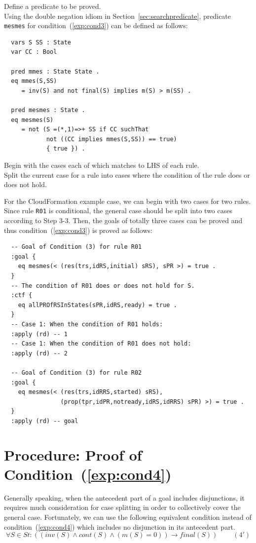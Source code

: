 \documentclass[12pt]{report}
\newcommand{\ra}{\rightarrow}
\begin{document}
 Define a predicate to be proved.\\
Using the double negation idiom in Section~\ref{sec:searchpredicate},
predicate {\tt mesmes} for condition~(\ref{exp:cond3}) can be defined
as follows:
\small
\begin{verbatim}
  vars S SS : State
  var CC : Bool

  pred mmes : State State .
  eq mmes(S,SS)
     = inv(S) and not final(S) implies m(S) > m(SS) .

  pred mesmes : State .
  eq mesmes(S)
     = not (S =(*,1)=>+ SS if CC suchThat
            not ((CC implies mmes(S,SS)) == true)
            { true }) .
\end{verbatim}
\normalsize

 Begin with the cases each of which matches to
LHS of each rule. \\ 
 Split the current case for a rule into
cases where the condition of the rule does or does not hold. 

For the CloudFormation example case, we can begin with two cases for
two rules. Since rule {\tt R01} is conditional, the general case
should be split into two cases according to Step 3-3. Then, the goals
of totally three cases can be proved and thus
condition~(\ref{exp:cond3}) is proved as follows:
\small
\begin{verbatim}
  -- Goal of Condition (3) for rule R01
  :goal {
    eq mesmes(< (res(trs,idRS,initial) sRS), sPR >) = true .
  }
  -- The condition of R01 does or does not hold for S.
  :ctf {
    eq allPROfRSInStates(sPR,idRS,ready) = true .
  }
  -- Case 1: When the condition of R01 holds:
  :apply (rd) -- 1
  -- Case 1: When the condition of R01 does not hold:
  :apply (rd) -- 2

  -- Goal of Condition (3) for rule R02
  :goal {
    eq mesmes(< (res(trs,idRRS,started) sRS),
                (prop(tpr,idPR,notready,idRS,idRRS) sPR) >) = true .
  }
  :apply (rd) -- goal
\end{verbatim}
\normalsize

\section{Procedure: Proof of Condition~(\ref{exp:cond4})}
\label{sec:mesfinal}
Generally speaking, when the antecedent part of a goal includes
disjunctions, it requires much consideration for case splitting in
order to collectively cover the general case. Fortunately, we can use
the following equivalent condition instead of
condition~(\ref{exp:cond4}) which includes no disjunction in its
antecedent part.
\[\forall S\in St:((inv(S)\land cont(S)\land(m(S) = 0))
  \ra final(S))~~~~~~~~~~(4')\]
\end{document}
